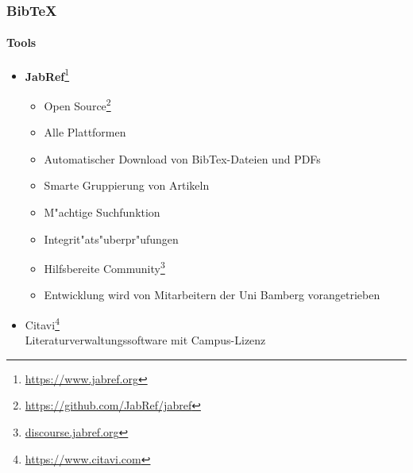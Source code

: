 \begin{frame}
\frametitle{BibTeX}
\framesubtitle{Tools}
\begin{itemize}
\item \textbf{JabRef}\footnote{\url{https://www.jabref.org}}
\begin{itemize}
	\item Open Source\footnote{\url{https://github.com/JabRef/jabref}}
	\item Alle Plattformen
	\item Automatischer Download von BibTex-Dateien und PDFs
	\item Smarte Gruppierung von Artikeln
	\item M"achtige Suchfunktion
	\item Integrit"ats"uberpr"ufungen
	\item Hilfsbereite Community\footnote{\url{discourse.jabref.org}}
	\item Entwicklung wird von Mitarbeitern der Uni Bamberg vorangetrieben
\end{itemize}
	
\item Citavi\footnote{\url{https://www.citavi.com}}\\
Literaturverwaltungssoftware mit Campus-Lizenz

\end{itemize}
\end{frame}
